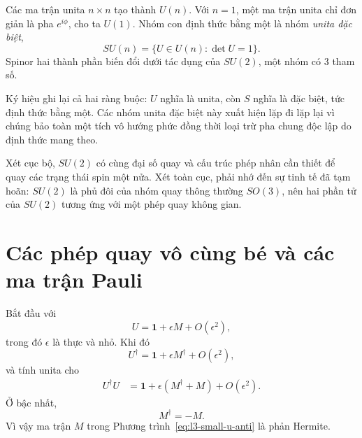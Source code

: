 Các ma trận unita \(n\times n\) tạo thành \(U(n)\). Với \(n=1\), một ma trận unita
chỉ đơn giản là pha \(e^{i\phi}\), cho ta \(U(1)\). Nhóm con định thức bằng một
là nhóm \emph{unita đặc biệt},
\begin{equation}
SU(n)=\{U\in U(n):\det U=1\}.
\end{equation}
Spinor hai thành phần biến đổi dưới tác dụng của \(SU(2)\), một nhóm có 3 tham số.

Ký hiệu ghi lại cả hai ràng buộc: \(U\) nghĩa là unita, còn \(S\)
nghĩa là đặc biệt, tức định thức bằng một. Các nhóm unita đặc biệt này xuất hiện
lặp đi lặp lại vì chúng bảo toàn một tích vô hướng phức đồng thời loại trừ
pha chung độc lập do định thức mang theo.

Xét cục bộ, \(SU(2)\) có cùng đại số quay và cấu trúc phép nhân cần thiết
để quay các trạng thái spin một nửa. Xét toàn cục, phải nhớ đến sự tinh tế đã
tạm hoãn: \(SU(2)\) là phủ đôi của nhóm quay thông thường
\(SO(3)\), nên hai phần tử của \(SU(2)\) tương ứng với một phép quay không gian.

\section{Các phép quay vô cùng bé và các ma trận Pauli}

\begin{classroomqa}
\end{classroomqa}

Bắt đầu với
\begin{equation}
U=\boldsymbol 1+\epsilon M+O(\epsilon^2),
\label{eq:l3-small-u-anti}
\end{equation}
trong đó \(\epsilon\) là thực và nhỏ. Khi đó
\begin{equation}
U^\dagger=\boldsymbol 1+\epsilon M^\dagger+O(\epsilon^2),
\end{equation}
và tính unita cho
\begin{align}
U^\dagger U
 &=\boldsymbol 1+\epsilon(M^\dagger+M)+O(\epsilon^2).
\end{align}
Ở bậc nhất,
\begin{equation}
M^\dagger=-M.
\end{equation}
Vì vậy ma trận \(M\) trong Phương trình~\eqref{eq:l3-small-u-anti} là
phản Hermite.


